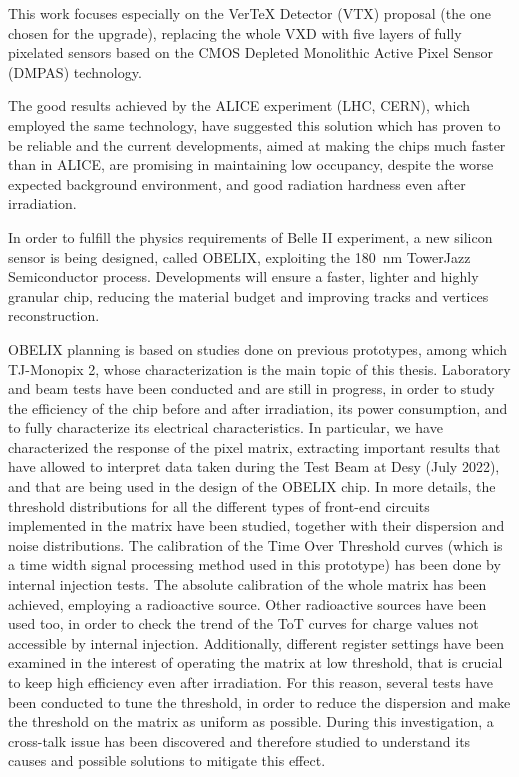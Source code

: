 \documentclass[10pt,a4paper]{report}
\begin{document}
This work focuses especially on the VerTeX Detector (VTX) proposal (the one chosen for the upgrade), replacing the whole VXD with five layers of fully pixelated sensors based on the CMOS Depleted Monolithic Active Pixel Sensor (DMPAS) technology.

The good results achieved by the ALICE experiment (LHC, CERN), which employed the same technology, have suggested this solution which has proven to be reliable and the current developments, aimed at making the chips much faster than in ALICE, are promising in maintaining low occupancy, despite the worse expected background environment, and good radiation hardness even after irradiation. 

In order to fulfill the physics requirements of Belle II experiment, a new silicon sensor is being designed, called OBELIX, exploiting the \SI{180}{nm} TowerJazz Semiconductor process. Developments will ensure a faster, lighter and highly granular chip, reducing the material budget and improving tracks and vertices reconstruction. 

OBELIX planning is based on studies done on previous prototypes, among which TJ-Monopix 2, whose characterization is the main topic of this thesis. Laboratory and beam tests have been conducted and are still in progress, in order to study the efficiency of the chip before and after irradiation, its power consumption, and to fully characterize its electrical characteristics. 
In particular, we have characterized the response of the pixel matrix, extracting important results that have allowed to interpret data taken during the Test Beam at Desy (July 2022), and that are being used in the design of the OBELIX chip. 
In more details, the threshold distributions for all the different types of front-end circuits implemented in the matrix have been studied, together with their dispersion and noise distributions. 
The calibration of the Time Over Threshold curves (which is a time width signal processing method used in this prototype) has been done by internal injection tests. The absolute calibration of the whole matrix has been achieved, employing a  radioactive source. Other radioactive sources have been used too, in order to check the trend of the ToT curves for charge values not accessible by internal injection. 
Additionally, different register settings have been examined in the interest of operating the matrix at low threshold, that is crucial to keep high efficiency even after irradiation. For this reason, several tests have been conducted to tune the threshold, in order to reduce the dispersion and make the threshold on the matrix as uniform as possible.
During this investigation, a cross-talk issue has been discovered and therefore studied to understand its causes and possible solutions to mitigate this effect.
\end{document}

